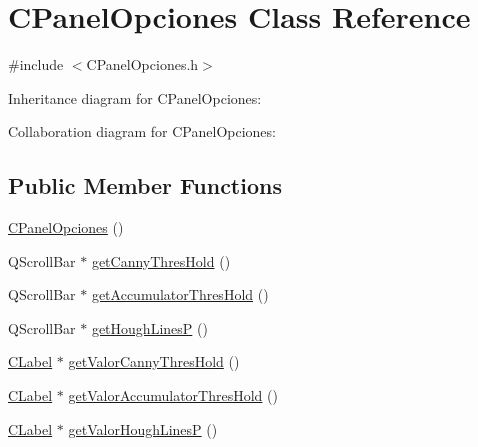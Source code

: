 \hypertarget{classCPanelOpciones}{}\section{C\+Panel\+Opciones Class Reference}
\label{classCPanelOpciones}


{\ttfamily \#include $<$C\+Panel\+Opciones.\+h$>$}



Inheritance diagram for C\+Panel\+Opciones\+:


Collaboration diagram for C\+Panel\+Opciones\+:
\subsection*{Public Member Functions}
\begin{DoxyCompactItemize}
\item 
\hyperlink{classCPanelOpciones_ad187a964b9ac72e6571ca699035195a3}{C\+Panel\+Opciones} ()
\item 
Q\+Scroll\+Bar $\ast$ \hyperlink{classCPanelOpciones_a69b8584e61b0fbd7a86c9b4b1af4fd60}{get\+Canny\+Thres\+Hold} ()
\item 
Q\+Scroll\+Bar $\ast$ \hyperlink{classCPanelOpciones_adefbced180846a9e7443aa6063ea39f8}{get\+Accumulator\+Thres\+Hold} ()
\item 
Q\+Scroll\+Bar $\ast$ \hyperlink{classCPanelOpciones_a26734902c1b8c353c83c6b3530be3c47}{get\+Hough\+LinesP} ()
\item 
\hyperlink{classCLabel}{C\+Label} $\ast$ \hyperlink{classCPanelOpciones_a65fee0477e988937ea93176f04657388}{get\+Valor\+Canny\+Thres\+Hold} ()
\item 
\hyperlink{classCLabel}{C\+Label} $\ast$ \hyperlink{classCPanelOpciones_a0f051efb1549353b79966471bc6b656f}{get\+Valor\+Accumulator\+Thres\+Hold} ()
\item 
\hyperlink{classCLabel}{C\+Label} $\ast$ \hyperlink{classCPanelOpciones_aae4983463e8d5e2d07fc93bee488af0b}{get\+Valor\+Hough\+LinesP} ()
\end{DoxyCompactItemize}
